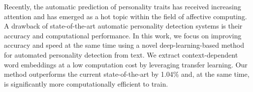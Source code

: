 Recently, the automatic prediction of personality traits has received increasing attention and has emerged as a hot topic within the field of affective computing.  A drawback of state-of-the-art automatic personality detection systems is their accuracy and computational performance. In this work, we focus on improving accuracy and speed at the same time using a novel deep-learning-based method for automated personality detection from text. We extract context-dependent word embeddings at a low computation cost by leveraging transfer learning. Our method outperforms the current state-of-the-art by 1.04\% and, at the same time, is significantly more computationally efficient to train.
